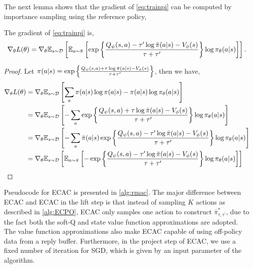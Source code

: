 The next lemma shows that the gradient of \cref{eq:trainpi} can be computed by importance sampling using the reference policy, 
\begin{lem}
\label{lem:rmacgradientestimate}
The gradient of \cref{eq:trainpi} is,
\begin{equation}
\label{eq:mac_gradient_estimator}
	\nabla_\theta L(\theta) = \nabla_\theta \mathbb{E}_{s \sim {\mathcal{D}}} \left[ \mathbb{E}_{a\sim \bar{\pi}}\left[  \exp\left\{ \frac{Q_{\psi}(s,a) - \tau' \log \bar{\pi}(a|s) - V_{\phi}(s)}{\tau+\tau'} \right\} \log \pi_{\theta}(a |s) \right]   \right].
\end{equation}
\end{lem}
\begin{proof}
Let $\pi(a \vert s) =  \exp\left\{ \frac{Q_{\psi}(s,a) + \tau \log \bar{\pi}(a|s) - V_{\phi}(s)}{\tau+\tau'} \right\}$, then we have,
\begin{align*}
	\nabla_\theta L(\theta) &= \nabla_\theta  \mathbb{E}_{s \sim {\mathcal{D}}} \left[\sum_a  \pi(a|s) \log \pi(a|s) - \pi(a|s) \log \pi_\theta(a|s) \right]\\
	&= \nabla_\theta \mathbb{E}_{s \sim {\mathcal{D}}} \left[ -\sum_a \exp\left\{ \frac{Q_{\psi}(s,a) + \tau \log \bar{\pi}(a|s) - V_{\phi}(s)}{\tau+\tau'} \right\} \log \pi_{\theta}(a |s) \right] \\ 
	&= \nabla_\theta \mathbb{E}_{s \sim {\mathcal{D}}} \left[ -\sum_a \bar{\pi}(a|s) \exp\left\{ \frac{Q_{\psi}(s,a) - \tau' \log \bar{\pi}(a|s) - V_{\phi}(s)}{\tau+\tau'} \right\} \log \pi_{\theta}(a |s) \right] \\ 
	&= \nabla_\theta \mathbb{E}_{s \sim {\mathcal{D}}} \left[ \mathbb{E}_{a\sim \bar{\pi}}\left[ - \exp\left\{ \frac{Q_{\psi}(s,a) - \tau' \log \bar{\pi}(a|s) - V_{\phi}(s)}{\tau+\tau'} \right\} \log \pi_{\theta}(a |s) \right]   \right] 
\end{align*}
\end{proof}
Pseudocode for ECAC is presented in \cref{alg:rmac}. The major difference between ECAC and ECAC in the lift step is that instead of sampling $K$ actions as described in \cref{alg:ECPO}, ECAC only samples one action to construct $\bar{\pi}_{\tau,\tau^{\prime}}^*$, due to the fact both the soft-Q and state value function approximations are adopted. The value function approximations also make ECAC capable of using off-policy data from a reply buffer. Furthermore, in the project step of ECAC, we use a fixed number of iteration for SGD, which is given by an input parameter of the algorithm.

